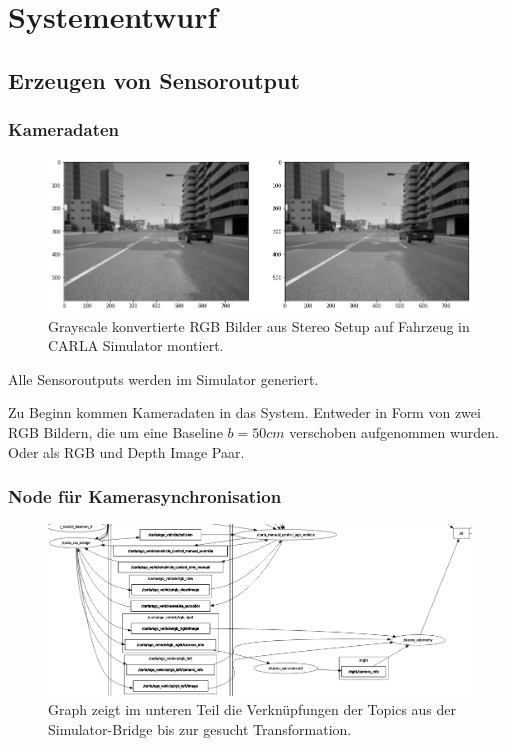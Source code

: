 \chapter{Systementwurf}
\section{Erzeugen von Sensoroutput}
%
\subsection{Kameradaten}
\begin{figure}[h!]
  \begin{center}
    \includegraphics[width=\textwidth]{pictures/load_images_systementwurf.png}
    \caption[Eingansdaten Bilder aus Stereoaufbau in CARLA Simulator]{Grayscale konvertierte RGB Bilder aus Stereo Setup auf Fahrzeug in CARLA Simulator montiert.}
  \end{center}
\end{figure}
%
Alle Sensoroutputs werden im Simulator generiert. 

Zu Beginn kommen Kameradaten in das System. Entweder in Form von zwei RGB Bildern, die um eine Baseline $b=50 cm$ verschoben aufgenommen wurden. 
%
Oder als RGB und Depth Image Paar.

\subsection{Node für Kamerasynchronisation}
\begin{center}
  \begin{figure}[h!]
    \centering
    \includegraphics[width=\textwidth]{pictures/06_ros_topic_graph.png}
    \caption[Graph der ROS2 Topics]{Graph zeigt im unteren Teil die Verknüpfungen der Topics aus der Simulator-Bridge bis zur gesucht Transformation.}
    \label{fig:rosgraph}
  \end{figure}
\end{center}

